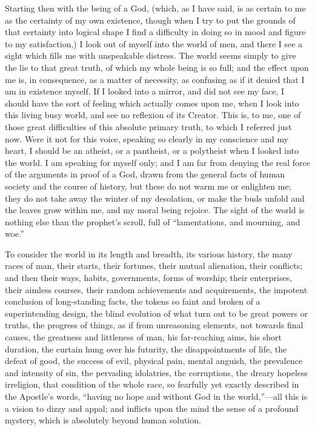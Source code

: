 Starting then with the being of a God, (which, as I have said, is as
certain to me as the certainty of my own existence, though when I try to
put the grounds of that certainty into logical shape I find a difficulty
in doing so in mood and figure to my satisfaction,) I look out of myself
into the world of men, and there I see a sight which fills me with
unspeakable distress. The world seems simply to give the lie to that
great truth, of which my whole being is so full; and the effect upon me
is, in consequence, as a matter of necessity, as confusing as if it
denied that I am in existence myself. If I looked into a mirror, and did
not see my face, I should have the sort of feeling which actually comes
upon me, when I look into this living busy world, and see no reflexion
of its Creator. This is, to me, one of those great difficulties
of this absolute primary truth, to which I referred just now. Were it
not for this voice, speaking so clearly in my conscience and my heart, I
should be an atheist, or a pantheist, or a polytheist when I looked into
the world. I am speaking for myself only; and I am far from denying the
real force of the arguments in proof of a God, drawn from the general
facts of human society and the course of history, but these do
not warm me or enlighten me; they do not take away the winter of my
desolation, or make the buds unfold and the leaves grow within me, and
my moral being rejoice. The sight of the world is nothing else than the
prophet's scroll, full of ``lamentations, and mourning, and
woe.''

To consider the world in its length and breadth, its various history,
the many races of man, their starts, their fortunes, their mutual
alienation, their conflicts; and then their ways, habits, governments,
forms of worship; their enterprises, their aimless courses, their random
achievements and acquirements, the impotent conclusion of long-standing
facts, the tokens so faint and broken of a superintending design, the
blind evolution of what turn out to be great powers or truths, the
progress of things, as if from unreasoning elements, not towards final
causes, the greatness and littleness of man, his far-reaching aims, his
short duration, the curtain hung over his futurity, the disappointments
of life, the defeat of good, the success of evil, physical pain, mental
anguish, the prevalence and intensity of sin, the pervading idolatries,
the corruptions, the dreary hopeless irreligion, that condition of the
whole race, so fearfully yet exactly described in the Apostle's words,
``having no hope and without God in the world,''—all this
is a vision to dizzy and appal; and inflicts upon the mind the sense of
a profound mystery, which is absolutely beyond human solution.

